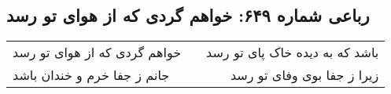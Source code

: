 \begin{center}
\section*{رباعی شماره ۶۴۹: خواهم گردی که از هوای تو رسد}
\label{sec:0649}
\begin{longtable}{l p{0.5cm} r}
خواهم گردی که از هوای تو رسد
&&
باشد که به دیده خاک پای تو رسد
\\
جانم ز جفا خرم و خندان باشد
&&
زیرا ز جفا بوی وفای تو رسد
\\
\end{longtable}
\end{center}
